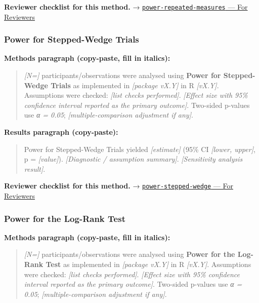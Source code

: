 \documentclass[
]{article}
\begin{document}
\textbf{Reviewer checklist for this method.} →
\href{../chapters/05-power/power-repeated-measures.Rmd\#for-reviewers}{\texttt{power-repeated-measures}
--- For Reviewers}

\subsubsection{Power for Stepped-Wedge
Trials}\label{power-for-stepped-wedge-trials}

\textbf{Methods paragraph (copy-paste, fill in italics):}

\begin{quote}
\emph{{[}N={]}} participants/observations were analysed using
\textbf{Power for Stepped-Wedge Trials} as implemented in
\emph{{[}package vX.Y{]}} in R \emph{{[}vX.Y{]}}. Assumptions were
checked: \emph{{[}list checks performed{]}}. \emph{{[}Effect size with
95\% confidence interval reported as the primary outcome{]}}. Two-sided
p-values use \emph{α = 0.05}; \emph{{[}multiple-comparison adjustment if
any{]}}.
\end{quote}

\textbf{Results paragraph (copy-paste):}

\begin{quote}
Power for Stepped-Wedge Trials yielded \emph{{[}estimate{]}} (95\% CI
\emph{{[}lower, upper{]}}, p = \emph{{[}value{]}}). \emph{{[}Diagnostic
/ assumption summary{]}}. \emph{{[}Sensitivity analysis result{]}}.
\end{quote}

\textbf{Reviewer checklist for this method.} →
\href{../chapters/05-power/power-stepped-wedge.Rmd\#for-reviewers}{\texttt{power-stepped-wedge}
--- For Reviewers}

\subsubsection{Power for the Log-Rank
Test}\label{power-for-the-log-rank-test}

\textbf{Methods paragraph (copy-paste, fill in italics):}

\begin{quote}
\emph{{[}N={]}} participants/observations were analysed using
\textbf{Power for the Log-Rank Test} as implemented in \emph{{[}package
vX.Y{]}} in R \emph{{[}vX.Y{]}}. Assumptions were checked: \emph{{[}list
checks performed{]}}. \emph{{[}Effect size with 95\% confidence interval
reported as the primary outcome{]}}. Two-sided p-values use \emph{α =
0.05}; \emph{{[}multiple-comparison adjustment if any{]}}.
\end{quote}
\end{document}
